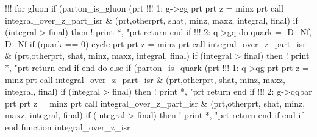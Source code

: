       !!! for gluon
      if (parton_is_gluon (prt%
         !!! 1: g->gg
         prt%
         prt%
           z = minz
           prt%
           call integral_over_z_part_isr &
                (prt,otherprt, shat, minz, maxz, integral, final)
           if (integral > final) then
              ! print *, "prt%
              return
           end if
           !!! 2: q->gq
           do quark = -D_Nf, D_Nf
              if (quark == 0) cycle
              prt%
              prt%
              z = minz
              prt%
              call integral_over_z_part_isr &
                   (prt,otherprt, shat, minz, maxz, integral, final)
              if (integral > final) then
                 ! print *, "prt%
                 return
              end if
           end do
        else if (parton_is_quark (prt%
           !!! 1: q->qg
           prt%
           prt%
           z = minz
           prt%
           call integral_over_z_part_isr &
                (prt,otherprt, shat, minz, maxz, integral, final)
           if (integral > final) then
              ! print *, "prt%
              return
           end if
           !!! 2: g->qqbar
           prt%
           prt%
           z = minz
           prt%
           call integral_over_z_part_isr &
                (prt,otherprt, shat, minz, maxz, integral, final)
           if (integral > final) then
              ! print *, "prt%
              return
           end if
        end if
      end function integral_over_z_isr

